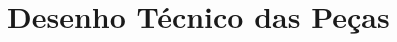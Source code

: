 \documentclass[oneside,openright,12pt]{ufsm_2015} %
\author{Eugênio Piveta Pozzobon}   %
\begin{document}
\pretextual  %















	
	





	
	
	

\apendice %

\chapter{Desenho Técnico das Peças}
\end{document}
